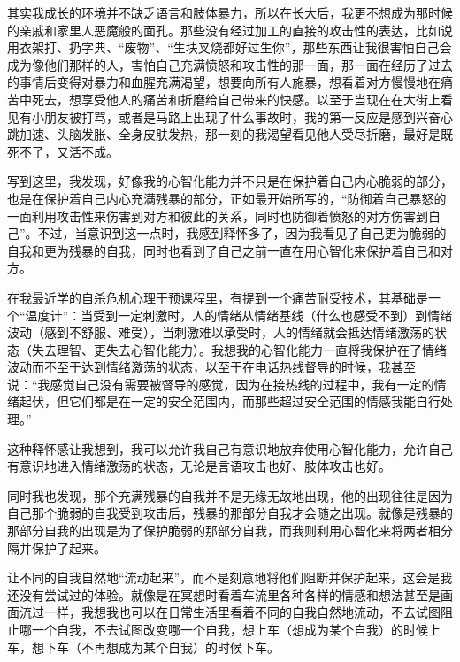 其实我成长的环境并不缺乏语言和肢体暴力，所以在长大后，我更不想成为那时候的亲戚和家里人恶魔般的面孔。那些没有经过加工的直接的攻击性的表达，比如说用衣架打、扔字典、“废物”、“生块叉烧都好过生你”，那些东西让我很害怕自己会成为像他们那样的人，害怕自己充满愤怒和攻击性的那一面，那一面在经历了过去的事情后变得对暴力和血腥充满渴望，想要向所有人施暴，想看着对方慢慢地在痛苦中死去，想享受他人的痛苦和折磨给自己带来的快感。以至于当现在在大街上看见有小朋友被打骂，或者是马路上出现了什么事故时，我的第一反应是感到兴奋\pozhehao{}心跳加速、头脑发胀、全身皮肤发热，那一刻的我渴望看见他人受尽折磨，最好是既死不了，又活不成。

写到这里，我发现，好像我的心智化能力并不只是在保护着自己内心脆弱的部分，也是在保护着自己内心充满残暴的部分，正如最开始所写的，“防御着自己暴怒的一面利用攻击性来伤害到对方和彼此的关系，同时也防御着愤怒的对方伤害到自己”。不过，当意识到这一点时，我感到释怀多了，因为我看见了自己更为脆弱的自我和更为残暴的自我，同时也看到了自己之前一直在用心智化来保护着自己和对方。

在我最近学的自杀危机心理干预课程里，有提到一个痛苦耐受技术，其基础是一个“温度计”：当受到一定刺激时，人的情绪从情绪基线（什么也感受不到）到情绪波动（感到不舒服、难受），当刺激难以承受时，人的情绪就会抵达情绪激荡的状态（失去理智、更失去心智化能力）。我想我的心智化能力一直将我保护在了情绪波动而不至于达到情绪激荡的状态，以至于在电话热线督导的时候，我甚至说：“我感觉自己没有需要被督导的感觉，因为在接热线的过程中，我有一定的情绪起伏，但它们都是在一定的安全范围内，而那些超过安全范围的情感我能自行处理。”


这种释怀感让我想到，我可以允许我自己有意识地放弃使用心智化能力，允许自己有意识地进入情绪激荡的状态，无论是言语攻击也好、肢体攻击也好。

同时我也发现，那个充满残暴的自我并不是无缘无故地出现，他的出现往往是因为自己那个脆弱的自我受到攻击后，残暴的那部分自我才会随之出现。就像是残暴的那部分自我的出现是为了保护脆弱的那部分自我，而我则利用心智化来将两者相分隔并保护了起来。

让不同的自我自然地“流动起来”，而不是刻意地将他们阻断并保护起来，这会是我还没有尝试过的体验。就像是在冥想时看着车流里各种各样的情感和想法甚至是画面流过一样，我想我也可以在日常生活里看着不同的自我自然地流动，不去试图阻止哪一个自我，不去试图改变哪一个自我，想上车（想成为某个自我）的时候上车，想下车（不再想成为某个自我）的时候下车。


